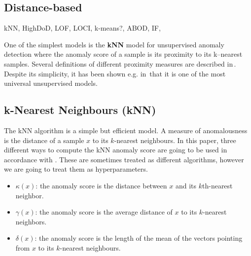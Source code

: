 \subsection{Distance-based}

kNN, HighDoD, LOF, LOCI, k-means?, ABOD, IF, 

One of the simplest models is the \textbf{kNN} model for
unsupervised anomaly detection where the anomaly score of a sample
is its proximity to its k--nearest samples. Several definitions of
different proximity measures are described in\,\cite{harmeling2006outliers}.
Despite its simplicity, it has been shown e.g. in\,\cite{campos2016evaluation}
that it is one of the most universal unsupervised models.

\subsection{k-Nearest Neighbours (kNN)}
The kNN algorithm \cite{ramaswamy2000efficient} is a simple but efficient model. A measure of anomalousness is the distance of a sample $x$ to its $k$-nearest neighbours. In this paper, three different ways to compute the kNN anomaly score are going to be used in accordance with \cite{harmeling2006outliers}. These are sometimes treated as different algorithms, however we are going to treat them as hyperparameters.
\begin{itemize}
  \item $\kappa(x)$: the anomaly score is the distance between $x$ and its $k$th-nearest neighbor.
  \item $\gamma(x)$: the anomaly score is the average distance of $x$ to its $k$-nearest neighbors. 
  \item $\delta(x)$: the anomaly score is the length of the mean of the vectors pointing from $x$ to its $k$-nearest neighbours.
\end{itemize}



